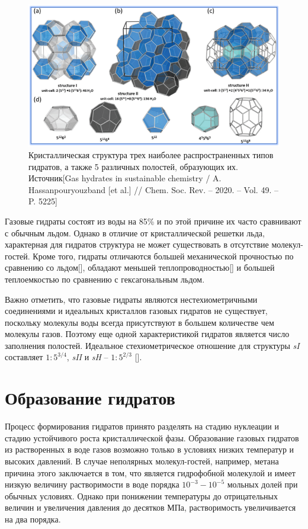 \begin{figure}[H]
    \centering
    \includegraphics[width=.9\linewidth]{figures/hydrstruct.png}
    \caption{Кристаллическая структура трех наиболее распространенных типов гидратов, а также 5 различных полостей, образующих их. Источник[Gas hydrates in sustainable chemistry / A. Hassanpouryouzband [et al.] // Chem. Soc. Rev. – 2020. – Vol. 49. – P. 5225]}
    \label{fig1.2.1}
\end{figure}

\par Газовые гидраты состоят из воды на 85\% и по этой причине их часто сравнивают с обычным льдом. Однако в отличие от кристаллической решетки льда, характерная для гидратов структура не может существовать в отсутствие молекул-гостей. Кроме того, гидраты отличаются большей механической прочностью по сравнению со льдом[], обладают меньшей теплопроводностью[] и большей теплоемкостью по сравнению с гексагональным льдом.

\par Важно отметить, что газовые гидраты являются нестехиометричными соединениями и идеальных кристаллов газовых гидратов не существует, поскольку молекулы воды всегда присутствуют в большем  количестве чем молекулы газов. Поэтому еще одной характеристикой гидратов является число заполнения полостей. Идеальное стехиометрическое отношение для структуры \textit{sI} составляет $1:5^{3/4}$, \textit{sII} и \textit{sH} -- $1:5^{2/3}$ [].

\pagebreak
\section{Образование гидратов}
\par Процесс формирования гидратов принято разделять на стадию нуклеации и стадию устойчивого роста кристаллической фазы. Образование газовых гидратов из растворенных в воде газов возможно только в условиях низких температур и высоких давлений. В случае неполярных молекул-гостей, например, метана причина этого заключается в том, что  является гидрофобной молекулой и имеет низкую величину растворимости в воде порядка $10^{-3}-10^{-5}$ мольных долей при обычных условиях. Однако при понижении температуры до отрицательных величин и увеличения давления до десятков МПа, растворимость   увеличивается на два порядка.

